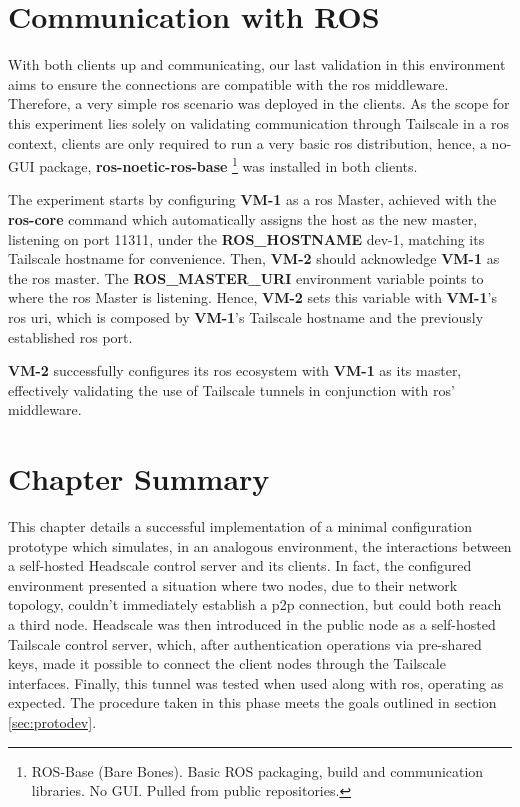 \documentclass[11pt,twoside,a4paper]{report}
\begin{document}
\section{Communication with ROS}

With both clients up and communicating, our last validation in this environment aims to ensure the connections are compatible with the \ac{ros} middleware. Therefore, a very simple \ac{ros} scenario was deployed in the clients. As the scope for this experiment lies solely on validating communication through Tailscale in a \ac{ros} context, clients are only required to run a very basic \ac{ros} distribution, hence, a no-GUI package, \textbf{ros-noetic-ros-base} \footnote{ROS-Base (Bare Bones). Basic ROS packaging, build and communication libraries. No GUI. Pulled from public repositories.} was installed in both clients.

The experiment starts by configuring \textbf{VM-1} as a \ac{ros} Master, achieved with the \textbf{ros-core} command which automatically assigns the host as the new master, listening on port 11311, under the \textbf{ROS\_HOSTNAME} dev-1, matching its Tailscale hostname for convenience. Then, \textbf{VM-2} should acknowledge \textbf{VM-1} as the \ac{ros} master. The \textbf{ROS\_MASTER\_URI} environment variable points to where the \ac{ros} Master is listening. Hence, \textbf{VM-2} sets this variable with \textbf{VM-1}'s \ac{ros} \ac{uri}, which is composed by \textbf{VM-1}'s Tailscale hostname and the previously established \ac{ros} port.

\textbf{VM-2} successfully configures its \ac{ros} ecosystem with \textbf{VM-1} as its master, effectively validating the use of Tailscale tunnels in conjunction with \ac{ros}' middleware.

\section{Chapter Summary}

This chapter details a successful implementation of a minimal configuration prototype which simulates, in an analogous environment, the interactions between a self-hosted Headscale control server and its clients. In fact, the configured environment presented a situation where two nodes, due to their network topology, couldn't immediately establish a \ac{p2p} connection, but could both reach a third node. Headscale was then introduced in the public node as a self-hosted Tailscale control server, which, after authentication operations via pre-shared keys, made it possible to connect the client nodes through the Tailscale interfaces. Finally, this tunnel was tested when used along with \ac{ros}, operating as expected. The procedure taken in this phase meets the goals outlined in section \ref{sec:protodev}.
\end{document}
